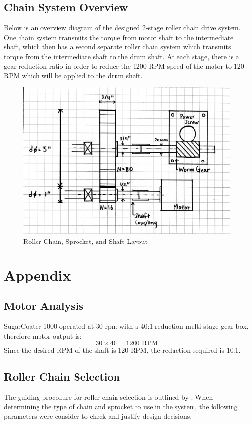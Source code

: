 \documentclass[letterpaper,12pt]{article}
\begin{document}
\subsection{Chain System Overview}
Below is an overview diagram of the designed 2-stage roller chain drive system. One chain system transmits the torque from motor shaft to the intermediate shaft, which then has a second separate roller chain system which transmits torque from the intermediate shaft to the drum shaft. At each stage, there is a gear reduction ratio in order to reduce the 1200 RPM speed of the motor to 120 RPM which will be applied to the drum shaft.
\begin{figure}[!ht]
\includegraphics[width=16cm]{MECH325A1System}
\caption{Roller Chain, Sprocket, and Shaft Layout}
\end{figure}

\newpage

\section{Appendix}
\subsection{Motor Analysis}
SugarCoater-1000 operated at 30 rpm with a 40:1 reduction multi-stage gear box, therefore motor output is:
$$30 \times 40 = 1200 \text{ RPM}$$
Since the desired RPM of the shaft is 120 RPM, the reduction required is 10:1.

\subsection{Roller Chain Selection}
The guiding procedure for roller chain selection is outlined by \cite{martin}. When determining the type of chain and sprocket to use in the system, the following parameters were consider to check and justify design decisions.
\end{document}
